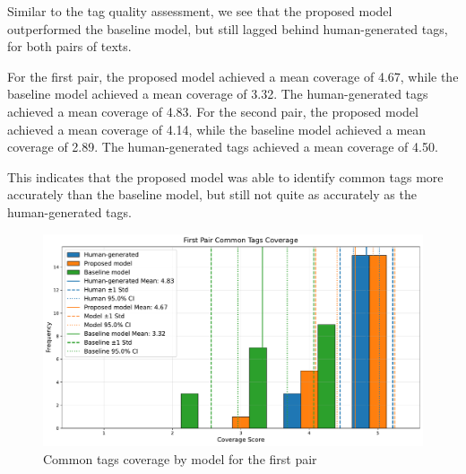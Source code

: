 Similar to the tag quality assessment, we see that the proposed model outperformed the baseline model, but still lagged behind human-generated tags, for both pairs of texts.

For the first pair, the proposed model achieved a mean coverage of 4.67, while the baseline model achieved a mean coverage of 3.32. The human-generated tags achieved a mean coverage of 4.83. For the second pair, the proposed model achieved a mean coverage of 4.14, while the baseline model achieved a mean coverage of 2.89. The human-generated tags achieved a mean coverage of 4.50.

This indicates that the proposed model was able to identify common tags more accurately than the baseline model, but still not quite as accurately as the human-generated tags.

\begin{figure}[h]
    \centering
    \includegraphics[width=1\textwidth]{figures/first_pair_common_tags_coverage_comparison.pdf}
    \caption{Common tags coverage by model for the first pair}
    \label{fig:first_pair_common_tags_coverage_comparison}
\end{figure}



